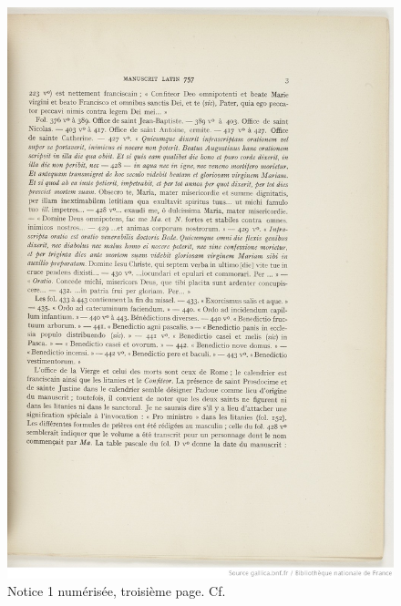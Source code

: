 \documentclass[a4paper,12pt,twoside]{book}
\begin{document}
    \begin{figure}[!h]
    \centering
    \includegraphics[width=15cm]{img/Notices_Leroquais/Notice1/Papier/notice_papier_1_3.jpeg}
    \caption{Notice 1 numérisée, troisième page. Cf. \cite[p. 3]{Leroquais_notices}}
    \end{figure}
    \clearpage
    
\end{document}
